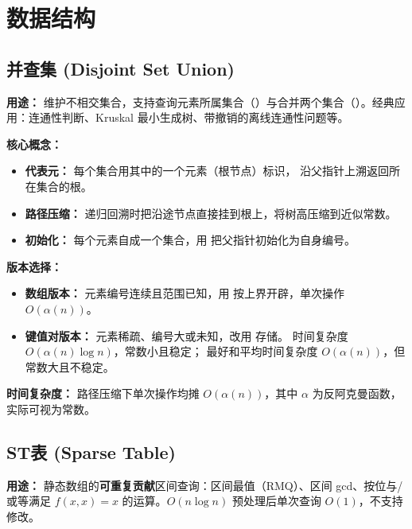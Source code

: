 \section{数据结构}

\subsection{并查集 (Disjoint Set Union)}

\textbf{用途：}
维护不相交集合，支持查询元素所属集合（）与合并两个集合（）。经典应用：连通性判断、Kruskal 最小生成树、带撤销的离线连通性问题等。

\textbf{核心概念：}
\begin{itemize}
  \item \textbf{代表元：} 每个集合用其中的一个元素（根节点）标识， 沿父指针上溯返回所在集合的根。
  \item \textbf{路径压缩：}  递归回溯时把沿途节点直接挂到根上，将树高压缩到近似常数。
  \item \textbf{初始化：} 每个元素自成一个集合，用  把父指针初始化为自身编号。
\end{itemize}

\textbf{版本选择：}
\begin{itemize}
  \item \textbf{数组版本：} 元素编号连续且范围已知，用  按上界开辟，单次操作 $O(\alpha(n))$。
  \item \textbf{键值对版本：} 元素稀疏、编号大或未知，改用  存储。 时间复杂度 $O(\alpha(n)\log n)$，常数小且稳定； 最好和平均时间复杂度 $O(\alpha(n))$，但常数大且不稳定。
\end{itemize}

\textbf{时间复杂度：} 路径压缩下单次操作均摊 $O(\alpha(n))$，其中 $\alpha$ 为反阿克曼函数，实际可视为常数。





\subsection{ST表 (Sparse Table)}

\textbf{用途：}
静态数组的\textbf{可重复贡献}区间查询：区间最值（RMQ）、区间 gcd、按位与/或等满足 $f(x, x) = x$ 的运算。$O(n \log n)$ 预处理后单次查询 $O(1)$，不支持修改。


